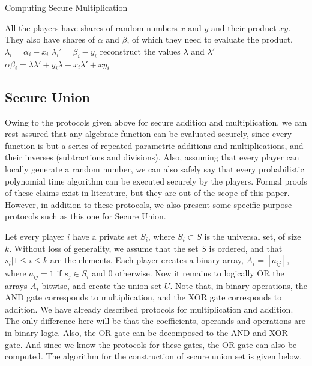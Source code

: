 \begin{algorithm}
\caption{Computing Secure Multiplication}
\label{algmult}
\begin{algorithmic}
\REQUIRE All the players have shares of random numbers $x$ and $y$ and their product $xy$.
They also have shares of $\alpha$ and $\beta$, of which they need to evaluate the product.
\STATE {}
	\STATE  $\lambda_{i} = \alpha_{i} - x_{i}$
	\STATE $\lambda_{i}' = \beta_{i} - y_{i}$
	\STATE reconstruct the values $\lambda$ and $\lambda'$
	\STATE $\alpha\beta_{i} = \lambda\lambda' + y_{i}\lambda + x_{i}\lambda' + xy_{i}$
\ENDFOR
\end{algorithmic}
\end{algorithm}


\subsection{Secure Union}
\label{sec:onion}

Owing to the protocols given above for secure addition and multiplication, we can rest assured that 
any algebraic function can be evaluated securely, since every function is but a series of repeated parametric
additions and multiplications, and their inverses (subtractions and divisions). Also, assuming that every player
can locally generate a random number, we can also safely say that every probabilistic polynomial time algorithm
can be executed securely by the players. Formal proofs of these claims exist in literature, but they are out of 
the scope of this paper. However, in addition to these protocols, we also present some specific purpose protocols
such as this one for Secure Union.

Let every player $i$ have a private set $S_{i}$, where $S_{i} \subset {S}$ is the universal set, of size $k$.
Without loss of generality, we assume that the set ${S}$ is ordered, and that ${s_{i}| 1 \leq i \leq k}$ are 
the elements. Each player creates a binary array, $A_{i} = [a_{ij}]$, where $a_{ij} = 1$ if $s_{j} \in S_{i}$ and $0$ otherwise.
Now it remains to logically OR the arrays $A_{i}$ bitwise, and create the union set $U$. Note that, in binary operations, 
the AND gate corresponds to multiplication, and the XOR gate corresponds to addition. We have already described protocols
for multiplication and addition. The only difference here will be that the coefficients, operands and operations are in 
binary logic. Also, the OR gate can be decomposed to the AND and XOR gate. And since we know the protocols for these
gates, the OR gate can also be computed. The algorithm for the construction of secure union set is given below.

